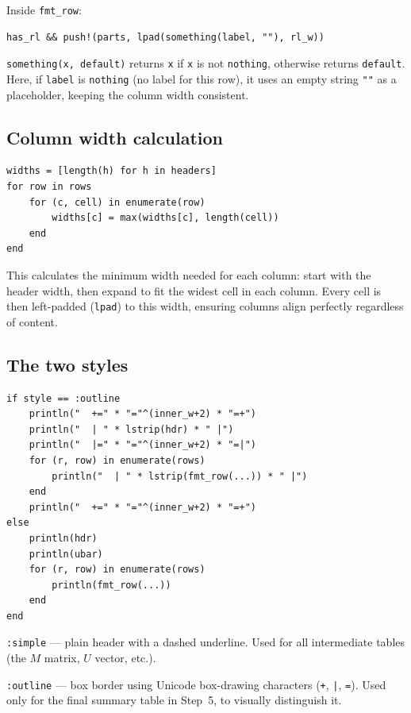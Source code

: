\documentclass[12pt, a4paper]{article}
\newcommand{\cd}[1]{\texttt{#1}}
\begin{document}
Inside \cd{fmt\_row}:

\begin{verbatim}
has_rl && push!(parts, lpad(something(label, ""), rl_w))
\end{verbatim}

\cd{something(x, default)} returns \cd{x} if \cd{x} is not
\cd{nothing}, otherwise returns \cd{default}.
Here, if \cd{label} is \cd{nothing} (no label for this row),
it uses an empty string \cd{""} as a placeholder,
keeping the column width consistent.

\subsection{Column width calculation}

\begin{verbatim}
widths = [length(h) for h in headers]
for row in rows
    for (c, cell) in enumerate(row)
        widths[c] = max(widths[c], length(cell))
    end
end
\end{verbatim}

This calculates the minimum width needed for each column:
start with the header width, then expand to fit the widest
cell in each column.
Every cell is then left-padded (\cd{lpad}) to this width,
ensuring columns align perfectly regardless of content.

\subsection{The two styles}

\begin{verbatim}
if style == :outline
    println("  +=" * "="^(inner_w+2) * "=+")
    println("  | " * lstrip(hdr) * " |")
    println("  |=" * "="^(inner_w+2) * "=|")
    for (r, row) in enumerate(rows)
        println("  | " * lstrip(fmt_row(...)) * " |")
    end
    println("  +=" * "="^(inner_w+2) * "=+")
else
    println(hdr)
    println(ubar)
    for (r, row) in enumerate(rows)
        println(fmt_row(...))
    end
end
\end{verbatim}

\cd{:simple} --- plain header with a dashed underline.
Used for all intermediate tables (the $M$ matrix, $U$ vector, etc.).

\cd{:outline} --- box border using Unicode box-drawing
characters (\cd{+}, \cd{|}, \cd{=}).
Used only for the final summary table in Step~5,
to visually distinguish it.
\end{document}
